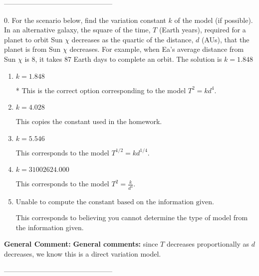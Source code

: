 \documentclass{extbook}[14pt]
\begin{document}
-----------------------------------------------

0. For the scenario below, find the variation constant $k$ of the model (if possible).
In an alternative galaxy, the square of the time, $T$ (Earth years), required for a planet to orbit Sun $\chi$ decreases as the quartic of the distance, $d$ (AUs), that the planet is from Sun $\chi$ decreases. For example, when Ea's average distance from Sun $\chi$ is 8, it takes 87 Earth days to complete an orbit. 
The solution is $ k = 1.848 $ 

\begin{enumerate}[label=\Alph*.] 
\item $ k = 1.848 $ 

 * This is the correct option corresponding to the model $T^{2} = k d^{4}$. 
\item $ k = 4.028 $ 

 This copies the constant used in the homework. 
\item $ k = 5.546 $ 

 This corresponds to the model $T^{1/2} = k d^{1/4}$. 
\item $ k = 31002624.000 $ 

 This corresponds to the model $T^{2} = \frac{k}{d^{4}}$. 
\item $ \text{Unable to compute the constant based on the information given.} $ 

 This corresponds to believing you cannot determine the type of model from the information given. 
\end{enumerate} 
 
\textbf{General Comment:} \textbf{General comments:} since $T$ decreases proportionally as $d$ decreases, we know this is a direct variation model. 

-----------------------------------------------
\end{document}
